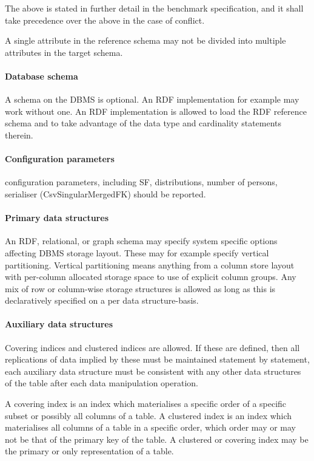 The above is stated in further detail in the benchmark specification, and it shall take precedence over the
above in the case of conflict.

A single attribute in the reference schema may not be divided into multiple attributes in the target schema.

\paragraph{Database schema}
A schema on the DBMS is optional. An RDF implementation for example may work without one. An RDF implementation is allowed to load the RDF reference schema and to take advantage of the data type and cardinality statements therein. 

\paragraph{Configuration parameters}
\datagen configuration parameters, including SF, distributions, number of persons, serialiser (\eg CsvSingularMergedFK) should be reported.

\paragraph{Primary data structures}
An RDF, relational, or graph schema may specify system specific options affecting DBMS storage layout. These may for example specify vertical partitioning. Vertical partitioning means anything from a column store layout with per-column allocated storage space to use of explicit column groups. Any mix of row or column-wise storage structures is allowed as long as this is declaratively specified on a per data structure-basis.

\paragraph{Auxiliary data structures}
Covering indices and clustered indices are allowed. If these are defined, then all replications of data implied by these must be maintained statement by statement, \ie each auxiliary data structure must be consistent with any other data structures of the table after each data manipulation operation.

A covering index is an index which materialises a specific order of a specific subset or possibly all columns of a table. 
A clustered index is an index which materialises all columns of a table in a specific order, which order may or may not be that of the primary key of the table. A clustered or covering index may be the primary or only representation of a table.

